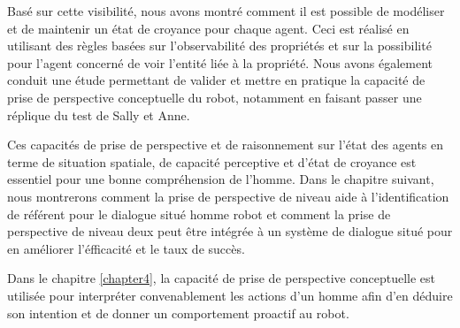 \documentclass[a4paper,11pt,twoside]{StyleThese}
\begin{document}
Basé sur cette visibilité, nous avons montré comment il est possible de modéliser et de maintenir un état de croyance pour chaque agent. Ceci est réalisé en utilisant des règles basées sur l'observabilité des propriétés et sur la possibilité pour l'agent concerné de voir l'entité liée à la propriété.
Nous avons également conduit une étude permettant de valider et mettre en pratique la capacité de prise de perspective conceptuelle du robot, notamment en faisant passer une réplique du test de Sally et Anne.

Ces capacités de prise de perspective et de raisonnement sur l'état des agents en terme de situation spatiale, de capacité perceptive et d'état de croyance est essentiel pour une bonne compréhension de l'homme.
Dans le chapitre suivant, nous montrerons comment la prise de perspective de niveau aide à l'identification de référent pour le dialogue situé homme robot et comment la prise de perspective de niveau deux peut être intégrée à un système de dialogue situé pour en améliorer l'éfficacité et le taux de succès.

Dans le chapitre \ref{chapter4}, la capacité de prise de perspective conceptuelle
est utilisée pour interpréter convenablement les actions d'un homme afin d'en déduire son intention et de donner un comportement proactif au robot.






\end{document}
